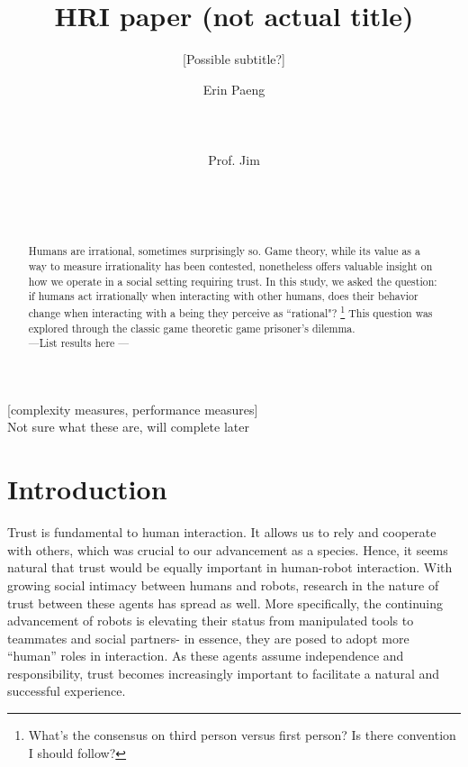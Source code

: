 \documentclass{sig-alternate}
\begin{document}
\title{HRI paper (not actual title)}
\subtitle{[Possible subtitle?]}

\author{
\alignauthor
Erin Paeng\\
       \\
       \\
       \\
\alignauthor
Prof. Jim\\
       \\
       \\
       \\
       }

\maketitle
\begin{abstract}
Humans are irrational, sometimes surprisingly so. Game theory, while its value as a way to measure irrationality has been contested, nonetheless offers valuable insight on how we operate in a social setting requiring trust. In this study, we asked the question: if humans act irrationally when interacting with other humans, does their behavior change when interacting with a being they perceive as ``rational"? \footnote{What's the consensus on third person versus first person? Is there convention I should follow?} This question was explored through the classic game theoretic game prisoner's dilemma.\\ ---List results here ---
\end{abstract}

[complexity measures, performance measures]
\\Not sure what these are, will complete later



\section{Introduction}
Trust is fundamental to human interaction. It allows us to rely and cooperate with others, which was crucial to our advancement as a species. Hence, it seems natural that trust would be equally important in human-robot interaction. With growing social intimacy between humans and robots, research in the nature of trust between these agents has spread as well. More specifically, the continuing advancement of robots is elevating their status from manipulated tools to teammates and social partners- in essence, they are posed to adopt more ``human'' roles in interaction. As these agents assume independence and responsibility, trust becomes increasingly important to facilitate a natural and successful experience.
\end{document}

